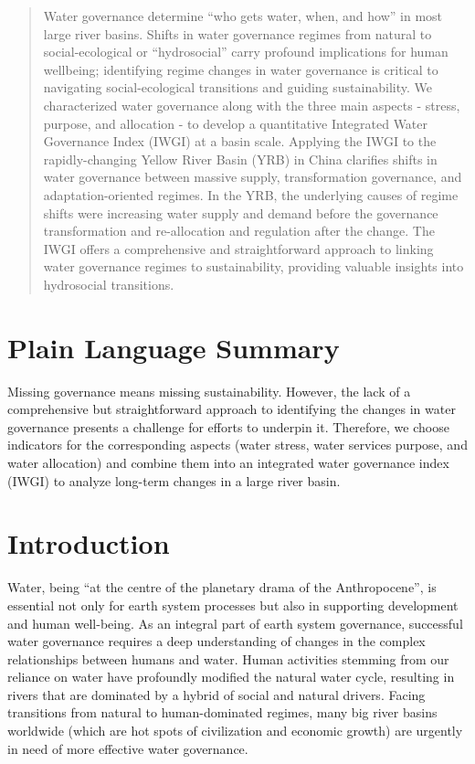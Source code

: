 \documentclass[draft]{../agujournal2019}
\providecommand{\DIFadd}[1]{{\protect\color{blue}\uwave{#1}}} %
\providecommand{\DIFaddbegin}{} %
\providecommand{\DIFaddend}{} %
\providecommand{\DIFdelbegin}{} %
\providecommand{\DIFdelend}{} %
\begin{document}
\begin{abstract}
Water governance determine ``who gets water, when, and how'' in most large river basins.
Shifts in water governance regimes from natural to social-ecological or ``hydrosocial'' carry profound implications for human wellbeing; identifying regime changes in water governance is critical to navigating social-ecological transitions and guiding sustainability.
We characterized water governance along with the three main aspects - stress, purpose, and allocation - to develop a quantitative Integrated Water Governance Index (IWGI) at a basin scale.
Applying the IWGI to the rapidly-changing Yellow River Basin (YRB) in China clarifies shifts in water governance between massive supply, transformation governance, and adaptation-oriented regimes.
In the YRB, the underlying causes of regime shifts were increasing water supply and demand before the governance transformation and re-allocation and regulation after the change.
The IWGI offers a comprehensive and straightforward approach to linking water governance regimes to sustainability, providing valuable insights into hydrosocial transitions.
\end{abstract}

\section*{Plain Language Summary}
Missing governance means missing sustainability. However, the lack of a comprehensive but straightforward approach to identifying the changes in water governance presents a challenge for efforts to underpin it. Therefore, we choose indicators for the corresponding aspects (water stress, water services purpose, and water allocation) and combine them into an integrated water governance index (IWGI) to analyze long-term changes in a large river basin.


\section{Introduction}\label{sec1}
\DIFdelbegin %
\DIFdelend \DIFaddbegin

\DIFaddend Water, being ``at the centre of the planetary drama of the Anthropocene'', is essential not only for earth system processes but also in supporting development and human well-being\DIFaddbegin \DIFadd{~}\DIFaddend \cite{gleeson2020a,gleeson2020b}.
As an integral part of earth system governance, successful water governance requires a deep understanding of changes in the complex relationships between humans and water\DIFaddbegin \DIFadd{~}\DIFaddend \cite{ahlstrom2021,biermann2012,steffen2020}.
Human activities stemming from our reliance on water have profoundly modified the natural water cycle, resulting in rivers that are dominated by a hybrid of social and natural drivers\DIFaddbegin \DIFadd{~}\DIFaddend \cite{sivapalan2012,qin2014a,abbott2019}.
Facing transitions from natural to human-dominated regimes, many big river basins worldwide (which are hot spots of civilization and economic growth) are urgently in need of more effective water governance\DIFaddbegin \DIFadd{~}\DIFaddend \cite{best2019,dibaldassarre2019}.
\end{document}
